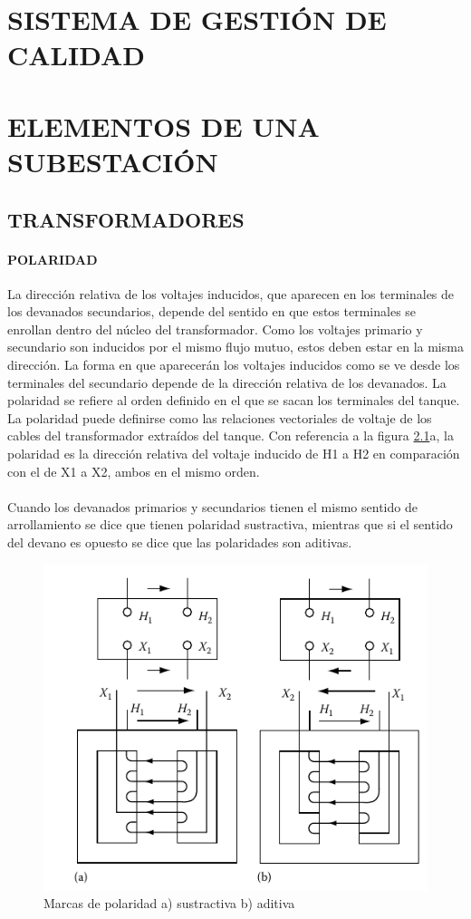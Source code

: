 \documentclass[a5paper]{book}%
\begin{document}
\chapter{SISTEMA DE GESTIÓN DE CALIDAD}

\chapter{ELEMENTOS DE UNA SUBESTACIÓN}

\section{TRANSFORMADORES}
\subsubsection{POLARIDAD}

La dirección relativa de los voltajes inducidos, que aparecen en los terminales de los devanados secundarios, depende del sentido en que estos terminales se enrollan dentro del núcleo  del transformador. Como los voltajes primario y secundario son inducidos por el mismo flujo mutuo, estos deben estar en la misma dirección. La forma en que aparecerán los voltajes inducidos como se ve desde los terminales del secundario depende de la dirección relativa de los devanados. La polaridad se refiere al orden definido en el que se sacan los terminales del tanque. La polaridad puede definirse como las relaciones vectoriales de voltaje de los cables del transformador extraídos del tanque. Con referencia a la figura \ref{fig:polaridadtransformadores}a, la polaridad es la dirección relativa del voltaje inducido de H1 a H2 en comparación con el de X1 a X2, ambos en el mismo orden.  \cite{POWERSADAS2012}\\\\
Cuando los devanados primarios y secundarios tienen el mismo sentido de arrollamiento se dice que tienen polaridad sustractiva, mientras que si el sentido del devano es opuesto se dice que las polaridades son aditivas.

\begin{figure}[H]
	\centering	\includegraphics[width=0.7\linewidth]{polaridad_transformadores}
	\caption{Marcas de polaridad a) sustractiva b) aditiva}
	\label{fig:polaridadtransformadores}
\end{figure}
\end{document}
